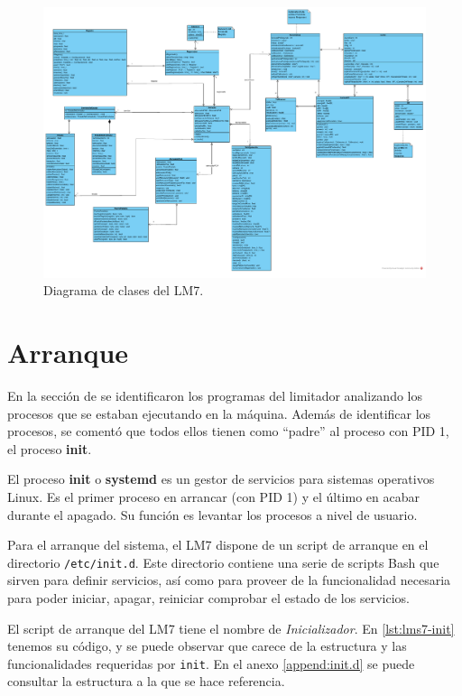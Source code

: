 \begin{figure}[h]
    \centering
    \includegraphics[scale=0.75, angle=90]{figuras/lms7-class-diagram.pdf}
    \caption{Diagrama de clases del LM7.}
    \label{fig:lm7-class-diagram}
\end{figure}

\clearpage
\section{Arranque} \label{sec:lms7-init}

En la sección de  se identificaron los programas del limitador analizando los procesos que se estaban ejecutando en la máquina. Además de identificar los procesos, se comentó que todos ellos tienen como ``padre'' al proceso con \acrshort{PID} 1, el proceso \textbf{init}.

\begin{shaded}
    \noindent
    El proceso \textbf{init} o \textbf{systemd} es un gestor de servicios para sistemas operativos Linux. Es el primer proceso en arrancar (con \acrshort{PID} 1) y el último en acabar durante el apagado. Su función es levantar los procesos a nivel de usuario.
\end{shaded}

Para el arranque del sistema, el LM7 dispone de un script de arranque en el directorio \verb|/etc/init.d|. Este directorio contiene una serie de scripts Bash que sirven para definir servicios, así como para proveer de la funcionalidad necesaria para poder iniciar, apagar, reiniciar comprobar el estado de los servicios.

El script de arranque del LM7 tiene el nombre de \textit{Inicializador}. En \ref{lst:lms7-init} tenemos su código, y se puede observar que carece de la estructura y las funcionalidades requeridas por \verb|init|. En el anexo \ref{append:init.d} se puede consultar la estructura a la que se hace referencia. \\

